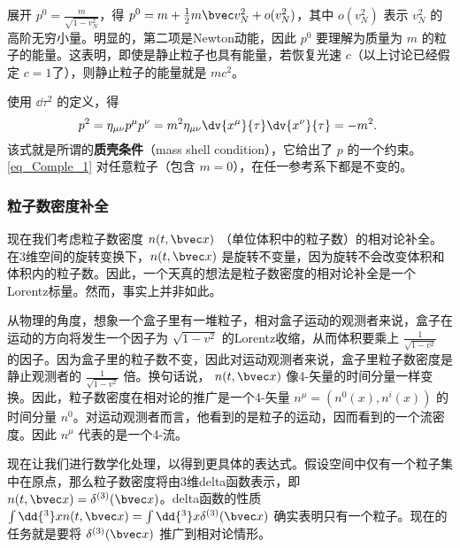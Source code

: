 展开 $p^0=\frac{m}{\sqrt{1-v_N^2}}$，得 $p^0=m+\frac{1}{2}m\bvec v_N^2+o(v_N^2)$，其中 $o(v_N^2)$ 表示 $v_N^2$ 的高阶无穷小量。明显的，第二项是Newton动能，因此 $p^0$ 要理解为质量为 $m$ 的粒子的能量。这表明，即使是静止粒子也具有能量，若恢复光速 $c$（以上讨论已经假定 $c=1$了），则静止粒子的能量就是 $mc^2$。

使用 $\dd\tau^2$ 的定义，得
\begin{equation}\label{eq_Comple_1}
p^2=\eta_{\mu\nu}p^\mu p^\nu=m^2\eta_{\mu\nu}\dv{x^\mu}{\tau}\dv{x^\nu}{\tau}=-m^2.~
\end{equation}
该式就是所谓的\textbf{质壳条件}（mass shell condition），它给出了 $p$ 的一个约束。\autoref{eq_Comple_1} 对任意粒子（包含 $m=0$），在任一参考系下都是不变的。


\subsubsection{粒子数密度补全}

现在我们考虑粒子数密度 $n(t,\bvec x)$ （单位体积中的粒子数）的相对论补全。在3维空间的旋转变换下，$n(t,\bvec x)$ 是旋转不变量，因为旋转不会改变体积和体积内的粒子数。因此，一个天真的想法是粒子数密度的相对论补全是一个Lorentz标量。然而，事实上并非如此。

从物理的角度，想象一个盒子里有一堆粒子，相对盒子运动的观测者来说，盒子在运动的方向将发生一个因子为 $\sqrt{1-v^2}$ 的Lorentz收缩，从而体积要乘上 $\frac{1}{\sqrt{1-v^2}}$ 的因子。因为盒子里的粒子数不变，因此对运动观测者来说，盒子里粒子数密度是静止观测者的 $\frac{1}{\sqrt{1-v^2}}$ 倍。换句话说， $n(t,\bvec x)$ 像4-矢量的时间分量一样变换。因此，粒子数密度在相对论的推广是一个4-矢量 $n^\mu=(n^0(x),n^i(x))$ 的时间分量 $n^0$。对运动观测者而言，他看到的是粒子的运动，因而看到的一个流密度。因此 $n^\mu$ 代表的是一个4-流。

现在让我们进行数学化处理，以得到更具体的表达式。假设空间中仅有一个粒子集中在原点，那么粒子数密度将由3维delta函数表示，即 $n(t,\bvec x)=\delta^{(3)}(\bvec x)$。delta函数的性质 $\int\dd{^3} xn(t,\bvec x)=\int\dd{^3} x\delta^{(3)}(\bvec x)$ 确实表明只有一个粒子。现在的任务就是要将 $\delta^{(3)}(\bvec x)$ 推广到相对论情形。

